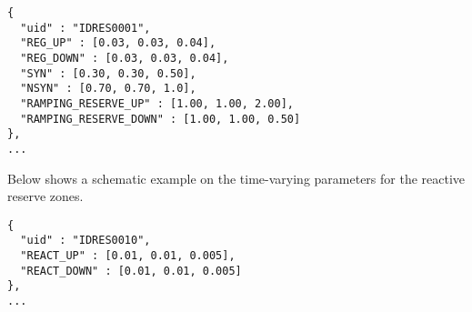 \begin{verbatim}
{
  "uid" : "IDRES0001",
  "REG_UP" : [0.03, 0.03, 0.04],
  "REG_DOWN" : [0.03, 0.03, 0.04],
  "SYN" : [0.30, 0.30, 0.50],
  "NSYN" : [0.70, 0.70, 1.0],
  "RAMPING_RESERVE_UP" : [1.00, 1.00, 2.00],
  "RAMPING_RESERVE_DOWN" : [1.00, 1.00, 0.50]
},
...
\end{verbatim}


Below shows a schematic example on the time-varying parameters for the reactive reserve zones.
\begin{verbatim}
{
  "uid" : "IDRES0010",
  "REACT_UP" : [0.01, 0.01, 0.005],
  "REACT_DOWN" : [0.01, 0.01, 0.005]
},
...
\end{verbatim}





